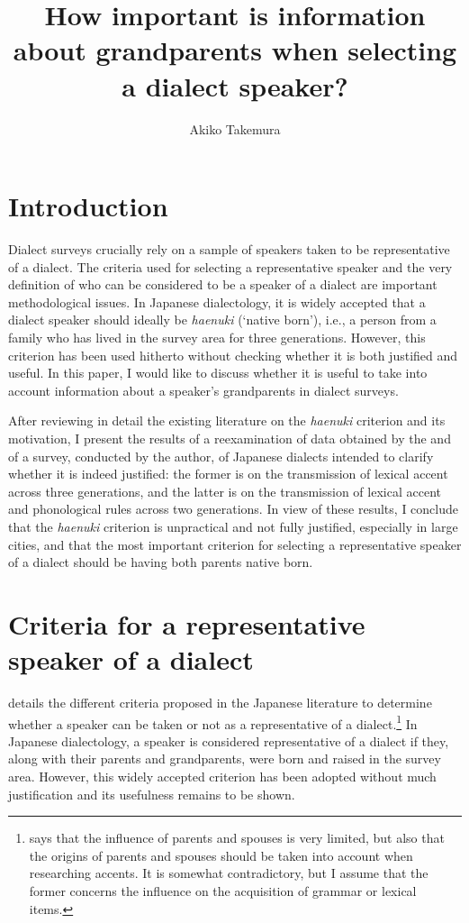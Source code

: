 \documentclass[output=paper,colorlinks,citecolor=brown]{langscibook}
\author{Akiko Takemura\orcid{}\affiliation{Université d'Orléans; Kobe University}}
\title[Information about grandparents when selecting a dialect speaker]
      {How important is information about grandparents when selecting a dialect speaker?}
\begin{document}
\maketitle
\label{chap:takemura}
\graphicspath{{figures/takemura}}

\section{Introduction}

Dialect surveys crucially rely on a sample of speakers taken to be representative of a dialect. The criteria used for selecting a representative speaker and the very definition of who can be considered to be a speaker of a dialect are important methodological issues. In Japanese dialectology, it is widely accepted that a dialect speaker should ideally be \emph{haenuki} (`native born'), i.e., a person from a family who has lived in the survey area for three generations. However, this criterion has been used hitherto without checking whether it is both justified and useful. In this paper, I would like to discuss whether it is useful to take into account information about a speaker's grandparents in dialect surveys.

After reviewing in detail the existing literature on the \emph{haenuki} criterion and its motivation, I present the results of a reexamination of data obtained by the \citet{NLRI1965}  and of a survey, conducted by the author, of Japanese dialects intended to clarify whether it is indeed justified: the former is on the transmission of lexical accent across three generations, and the latter is on the transmission of lexical accent and phonological rules across two generations. In view of these results, I conclude that the \emph{haenuki} criterion is unpractical and not fully justified, especially in large cities, and that the most important criterion for selecting a representative speaker of a dialect should be having both parents native born.

\section{Criteria for a representative speaker of a dialect}

 details the different criteria proposed in the Japanese literature to determine whether a speaker can be taken or not as a representative of a dialect.\footnote{\textcite{Yoshida1984} says that the influence of parents and spouses is very limited, but also that the origins of parents and spouses should be taken into account when researching accents. It is somewhat contradictory, but I assume that the former concerns the influence on the acquisition of grammar or lexical items.} In Japanese dialectology, a speaker is considered representative of a dialect if they, along with their parents and grandparents, were born and raised in the survey area. However, this widely accepted criterion has been adopted without much justification and its usefulness remains to be shown.
\end{document}
